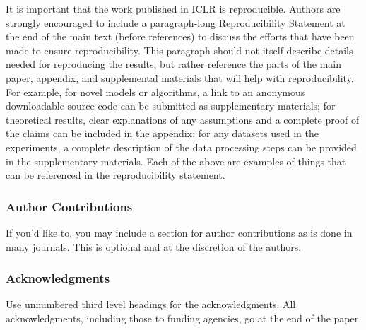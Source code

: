 \documentclass{article} %
\begin{document}
It is important that the work published in ICLR is reproducible. Authors are
strongly encouraged to include a paragraph-long Reproducibility Statement at the
end of the main text (before references) to discuss the efforts that have been
made to ensure reproducibility. This paragraph should not itself describe
details needed for reproducing the results, but rather reference the parts of
the main paper, appendix, and supplemental materials that will help with
reproducibility. For example, for novel models or algorithms, a link to an
anonymous downloadable source code can be submitted as supplementary materials;
for theoretical results, clear explanations of any assumptions and a complete
proof of the claims can be included in the appendix; for any datasets used in
the experiments, a complete description of the data processing steps can be
provided in the supplementary materials. Each of the above are examples of
things that can be referenced in the reproducibility statement.

\subsubsection*{Author Contributions}
If you'd like to, you may include  a section for author contributions as is done
in many journals. This is optional and at the discretion of the authors.

\subsubsection*{Acknowledgments}
Use unnumbered third level headings for the acknowledgments. All
acknowledgments, including those to funding agencies, go at the end of the paper.





\clearpage
\appendix

\clearpage

\clearpage

\clearpage

\end{document}
